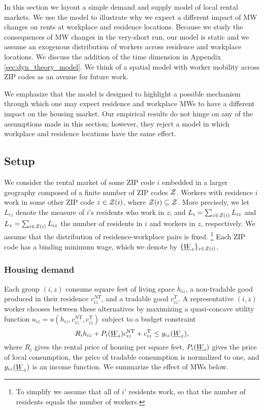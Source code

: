 
In this section we layout a simple demand and supply model of local rental markets.
We use the model to illustrate why we expect a different impact of MW changes 
on rents at workplace and residence locations.
Because we study the consequences of MW changes in the very-short run, our model is 
static and we assume an exogenous distribution of workers across residence and 
workplace locations.
We discuss the addition of the time dimension in Appendix \ref{sec:dyn_theory_model}.
We think of  a spatial model with worker mobility across ZIP codes as an avenue 
for future work.

We emphasize that the model is designed to highlight a possible mechanism through 
which one may expect residence and workplace MWs to have a different impact on the 
housing market.
Our empirical results do not hinge on any of the assumptions made in this section;
however, they reject a model in which workplace and residence locations have the 
same effect.

\subsection{Setup}

We consider the rental market of some ZIP code $i$ embedded in a larger geography 
composed of a finite number of ZIP codes $\mathcal{Z}$.
Workers with residence $i$ work in some other ZIP code $z\in\mathcal{Z}(i)$, where 
$\mathcal{Z}(i)\subseteq\mathcal{Z}$.
More precisely, we let $L_{iz}$ denote the measure of $i$'s residents who work in 
$z$; and 
$L_i = \sum_{z \in \mathcal{Z}(i)} L_{iz}$ and $L_z = \sum_{i \in \mathcal{Z}(i)} L_{iz}$ the number
of residents in $i$ and workers in $z$, respectively.
We assume that the distribution of residence-workplace pairs is fixed.%
\footnote{To simplify we assume that all of $i$' residents work, so that the number
of residents equals the number of workers.}
Each ZIP code has a binding minimum wage, which we denote by $\{\underline{W}_z\}_{z\in\mathcal{Z}(i)}$.

\subsubsection*{Housing demand}

Each group $(i,z)$ consume
square feet of living space $h_{iz}$, 
a non-tradable good produced in their residence $c_{iz}^{NT}$, and
a tradable good $c_{iz}^T$.
A representative $(i,z)$ worker chooses between these alternatives by maximizing
a quasi-concave utility function 
$u_{iz} = u \left(h_{iz}, c^{\text{NT}}_{iz}, c^{\text{T}}_{iz}\right)$
subject to a budget constraint
$$R_i h_{iz} + P_i(\underline{W}_i) c^{\text{NT}}_{iz} + c^{\text{T}}_{iz} \leq y_{iz}(\underline{W}_z),$$
where
$R_i$ gives the rental price of housing per square feet,
$P_i(\underline{W}_i)$ gives the price of local consumption,
the price of tradable consumption is normalized to one, and 
$y_{iz}(\underline{W}_z)$ is an income function.
We summarize the effect of MWs below.

